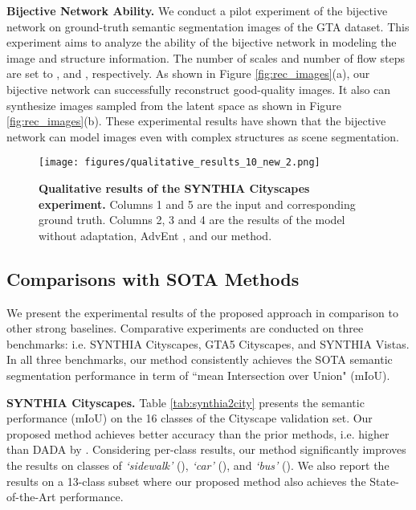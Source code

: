 \documentclass[10pt,twocolumn,letterpaper]{article}
\begin{document}
\textbf{Bijective Network Ability. } 
We conduct a pilot experiment of the bijective network on ground-truth semantic segmentation images of the GTA dataset.
This experiment aims to analyze the ability of the bijective network in modeling the image and structure information.
The number of scales and number of flow steps are set to , and , respectively. 
As shown in Figure \ref{fig:rec_images}(a), our bijective network can successfully reconstruct good-quality images. 
It also can synthesize images sampled from the latent space as shown in Figure \ref{fig:rec_images}(b). These experimental results have shown that the bijective network can model images even with complex structures as scene segmentation.














\begin{figure*}[t]
    \centering
\texttt{[image: figures/qualitative\_results\_10\_new\_2.png]}
    \caption{\textbf{Qualitative results of the SYNTHIA  Cityscapes experiment.} Columns 1 and 5 are the input and corresponding ground truth. Columns 2, 3 and 4 are the results of the model without adaptation, AdvEnt \cite{vu2019advent}, and our method.} \label{fig:qual_res_synthia2cityscape}
    \vspace{-5mm}
\end{figure*}

\subsection{Comparisons with SOTA Methods}

We present the experimental results of the proposed approach in comparison to other strong baselines.
Comparative experiments are conducted on three benchmarks: 
i.e. SYNTHIA  Cityscapes, GTA5  Cityscapes, and SYNTHIA  Vistas. In all three benchmarks, our method consistently achieves the SOTA semantic segmentation performance in term of ``mean Intersection over Union" (mIoU).

\textbf{SYNTHIA  Cityscapes.} Table \ref{tab:synthia2city} presents the semantic performance (mIoU) on the 16 classes of the Cityscape validation set. Our proposed method achieves better accuracy than the prior methods, i.e.  higher than DADA \cite{vu2019dada} by . Considering per-class results, our method significantly improves the results on classes of \textit{`sidewalk'} (), \textit{`car'} (), and \textit{`bus'} (). 
We also report the results on a 13-class subset where our proposed method also achieves the State-of-the-Art performance.
\end{document}
